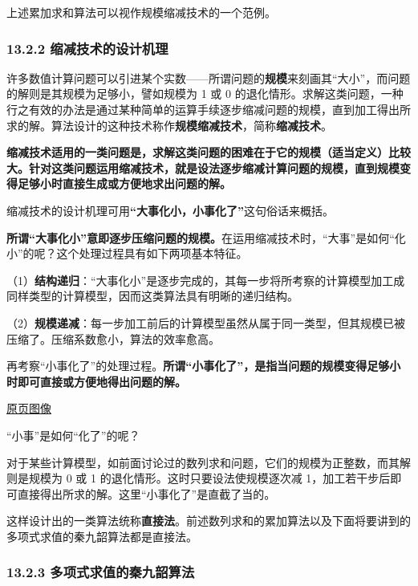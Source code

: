 \documentclass[
  10pt,
  fontset=fandol]{ctexart}
\begin{document}
上述累加求和算法可以视作规模缩减技术的一个范例。

\subsubsection{13.2.2 缩减技术的设计机理}\label{ux7f29ux51cfux6280ux672fux7684ux8bbeux8ba1ux673aux7406}

许多数值计算问题可以引进某个实数------所谓问题的\textbf{规模}来刻画其``大小''，而问题的解则是其规模为足够小，譬如规模为 1 或 0 的退化情形。求解这类问题，一种行之有效的办法是通过某种简单的运算手续逐步缩减问题的规模，直到加工得出所求的解。算法设计的这种技术称作\textbf{规模缩减技术}，简称\textbf{缩减技术}。

\textbf{缩减技术适用的一类问题是，求解这类问题的困难在于它的规模（适当定义）比较大。针对这类问题运用缩减技术，就是设法逐步缩减计算问题的规模，直到规模变得足够小时直接生成或方便地求出问题的解。}

缩减技术的设计机理可用\textbf{``大事化小，小事化了''}这句俗话来概括。

\textbf{所谓``大事化小''意即逐步压缩问题的规模。}在运用缩减技术时，``大事''是如何``化小''的呢？这个处理过程具有如下两项基本特征。

（1）\textbf{结构递归}：``大事化小''是逐步完成的，其每一步将所考察的计算模型加工成同样类型的计算模型，因而这类算法具有明晰的递归结构。

（2）\textbf{规模递减}：每一步加工前后的计算模型虽然从属于同一类型，但其规模已被压缩了。压缩系数愈小，算法的效率愈高。

再考察``小事化了''的处理过程。\textbf{所谓``小事化了''，是指当问题的规模变得足够小时即可直接或方便地得出问题的解。}

\href{../../source-images/pdf-310.jpeg}{原页图像}

``小事''是如何``化了''的呢？

对于某些计算模型，如前面讨论过的数列求和问题，它们的规模为正整数，而其解则是规模为 0 或 1 的退化情形。这时只要设法使规模逐次减 1，加工若干步后即可直接得出所求的解。这里``小事化了''是直截了当的。

这样设计出的一类算法统称\textbf{直接法}。前述数列求和的累加算法以及下面将要讲到的多项式求值的秦九韶算法都是直接法。

\subsubsection{13.2.3 多项式求值的秦九韶算法}\label{ux591aux9879ux5f0fux6c42ux503cux7684ux79e6ux4e5dux97f6ux7b97ux6cd5}
\end{document}
